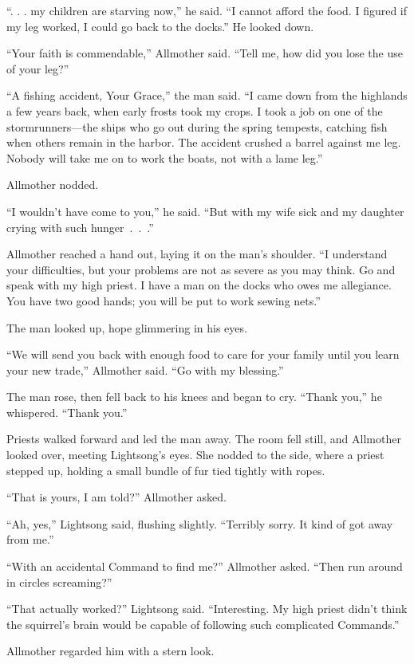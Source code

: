 “. . . my children are starving now,” he said. “I cannot afford the food. I figured if my leg worked, I could go back to the docks.” He looked down.

“Your faith is commendable,” Allmother said. “Tell me, how did you lose the use of your leg?”

“A fishing accident, Your Grace,” the man said. “I came down from the highlands a few years back, when early frosts took my crops. I took a job on one of the stormrunners—the ships who go out during the spring tempests, catching fish when others remain in the harbor. The accident crushed a barrel against me leg. Nobody will take me on to work the boats, not with a lame leg.”

Allmother nodded.

“I wouldn’t have come to you,” he said. “But with my wife sick and my daughter crying with such hunger~.~.~.”

Allmother reached a hand out, laying it on the man’s shoulder. “I understand your difficulties, but your problems are not as severe as you may think. Go and speak with my high priest. I have a man on the docks who owes me allegiance. You have two good hands; you will be put to work sewing nets.”

The man looked up, hope glimmering in his eyes.

“We will send you back with enough food to care for your family until you learn your new trade,” Allmother said. “Go with my blessing.”

The man rose, then fell back to his knees and began to cry. “Thank you,” he whispered. “Thank you.”

Priests walked forward and led the man away. The room fell still, and Allmother looked over, meeting Lightsong’s eyes. She nodded to the side, where a priest stepped up, holding a small bundle of fur tied tightly with ropes.

“That is yours, I am told?” Allmother asked.

“Ah, yes,” Lightsong said, flushing slightly. “Terribly sorry. It kind of got away from me.”

“With an accidental Command to find me?” Allmother asked. “Then run around in circles screaming?”

“That actually worked?” Lightsong said. “Interesting. My high priest didn’t think the squirrel’s brain would be capable of following such complicated Commands.”

Allmother regarded him with a stern look.

